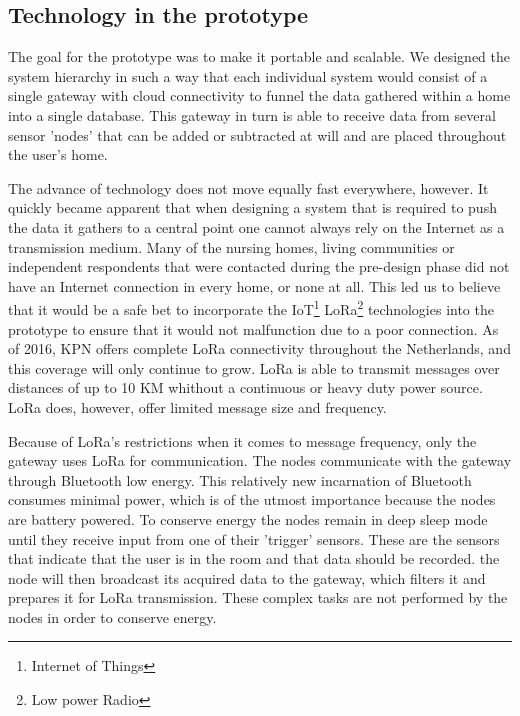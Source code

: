 \documentclass{below-ext}
\begin{document}
\subsection{Technology in the prototype}

The goal for the prototype was to make it portable and scalable. We designed the system hierarchy in such a way that each individual system would consist of a single gateway with cloud connectivity to funnel the data gathered within a home into a single database. This gateway  in turn is able to receive data from several sensor 'nodes' that can be added or subtracted at will and are placed throughout the user's home. 
 
The advance of technology does not move equally fast everywhere, however. It quickly became apparent that when designing a system that is required to push the data it gathers to a central point one cannot always rely on the Internet as a transmission medium. Many of the nursing homes, living communities or independent respondents that were contacted during the pre-design phase did not have an Internet connection in every home, or none at all. This led us to believe that it would be a safe bet to incorporate the IoT\footnote{Internet of Things} LoRa\footnote{Low power Radio} technologies into the prototype to ensure that it would not malfunction due to a poor connection. As of 2016, KPN offers complete LoRa connectivity throughout the Netherlands, and this coverage will only continue to grow. LoRa is able to transmit messages over distances of up to 10 KM whithout a continuous or heavy duty power source. LoRa does, however, offer limited message size and frequency. 


Because of LoRa's restrictions when it comes to message frequency, only the gateway uses LoRa for communication. The nodes communicate with the gateway through Bluetooth low energy. This relatively new incarnation of Bluetooth consumes minimal power, which is of the utmost importance because the nodes are battery powered. To conserve energy the nodes remain in deep sleep mode until they receive input from one of their  'trigger' sensors. These are the sensors that indicate that the user is in the room and that data should be recorded. the node will then broadcast its acquired data to the gateway, which filters it and prepares it for LoRa transmission. These complex tasks are not performed by the nodes in order to conserve energy.  
\end{document}
